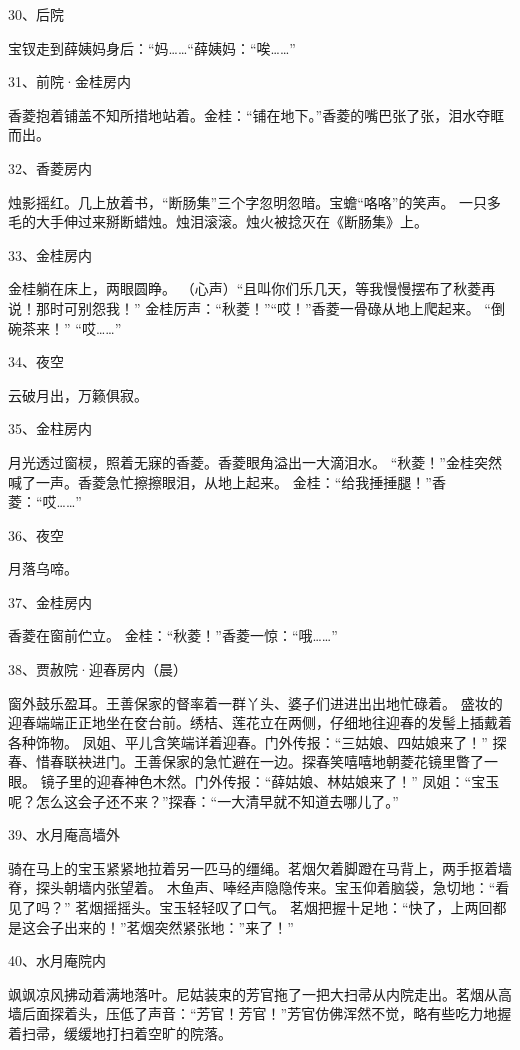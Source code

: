 30、后院\par
宝钗走到薛姨妈身后：“妈……“薛姨妈：“唉……”

31、前院·金桂房内\par

香菱抱着铺盖不知所措地站着。金桂：“铺在地下。”香菱的嘴巴张了张，泪水夺眶而出。

32、香菱房内\par

烛影摇红。几上放着书，“断肠集”三个字忽明忽暗。宝蟾“咯咯”的笑声。
一只多毛的大手伸过来掰断蜡烛。烛泪滚滚。烛火被捻灭在《断肠集》上。

33、金桂房内\par
金桂躺在床上，两眼圆睁。
（心声）“且叫你们乐几天，等我慢慢摆布了秋菱再说！那时可别怨我！”
金桂厉声：“秋菱！”“哎！”香菱一骨碌从地上爬起来。
“倒碗茶来！”
“哎……”

34、夜空\par
云破月出，万籁俱寂。

35、金柱房内\par
月光透过窗棂，照着无寐的香菱。香菱眼角溢出一大滴泪水。
“秋菱！”金桂突然喊了一声。香菱急忙擦擦眼泪，从地上起来。
金桂：“给我捶捶腿！”香菱：“哎……”

36、夜空\par
月落乌啼。

37、金桂房内\par
香菱在窗前伫立。
金桂：“秋菱！”香菱一惊：“哦……”


38、贾赦院·迎春房内（晨）\par
窗外鼓乐盈耳。王善保家的督率着一群丫头、婆子们进进出出地忙碌着。
盛妆的迎春端端正正地坐在奁台前。绣桔、莲花立在两侧，仔细地往迎春的发髻上插戴着各种饰物。
凤姐、平儿含笑端详着迎春。门外传报：“三姑娘、四姑娘来了！”
探春、惜春联袂进门。王善保家的急忙避在一边。探春笑嘻嘻地朝菱花镜里瞥了一眼。
镜子里的迎春神色木然。门外传报：“薛姑娘、林姑娘来了！”
凤姐：“宝玉呢？怎么这会子还不来？”探春：“一大清早就不知道去哪儿了。”

39、水月庵高墙外\par
骑在马上的宝玉紧紧地拉着另一匹马的缰绳。茗烟欠着脚蹬在马背上，两手抠着墙脊，探头朝墙内张望着。
木鱼声、唪经声隐隐传来。宝玉仰着脑袋，急切地：“看见了吗？”
茗烟摇摇头。宝玉轻轻叹了口气。
茗烟把握十足地：“快了，上两回都是这会子出来的！”茗烟突然紧张地：”来了！”

40、水月庵院内\par
飒飒凉风拂动着满地落叶。尼姑装束的芳官拖了一把大扫帚从内院走出。茗烟从高墙后面探着头，压低了声音：“芳官！芳官！”芳官仿佛浑然不觉，略有些吃力地握着扫帚，缓缓地打扫着空旷的院落。 

